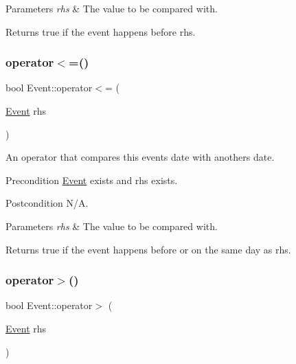 \begin{DoxyParams}{Parameters}
{\em rhs} & The value to be compared with. \\
\hline
\end{DoxyParams}
\begin{DoxyReturn}{Returns}
true if the event happens before rhs. 
\end{DoxyReturn}
\mbox{\label{class_event_a4904fea0b4f4f5bd57ba4858414f32ed}} 
\subsubsection{\texorpdfstring{operator$<$=()}{operator<=()}}
{\footnotesize\ttfamily bool Event\+::operator$<$= (\begin{DoxyParamCaption}\item[{\mbox{\hyperlink{class_event}{Event}}}]{rhs }\end{DoxyParamCaption})}

An operator that compares this event\textquotesingle{}s date with another\textquotesingle{}s date. \begin{DoxyPrecond}{Precondition}
\mbox{\hyperlink{class_event}{Event}} exists and rhs exists. 
\end{DoxyPrecond}
\begin{DoxyPostcond}{Postcondition}
N/A. 
\end{DoxyPostcond}

\begin{DoxyParams}{Parameters}
{\em rhs} & The value to be compared with. \\
\hline
\end{DoxyParams}
\begin{DoxyReturn}{Returns}
true if the event happens before or on the same day as rhs. 
\end{DoxyReturn}
\mbox{\label{class_event_aceb2fbaf2cb83f5d7e14787db516cd34}} 
\subsubsection{\texorpdfstring{operator$>$()}{operator>()}}
{\footnotesize\ttfamily bool Event\+::operator$>$ (\begin{DoxyParamCaption}\item[{\mbox{\hyperlink{class_event}{Event}}}]{rhs }\end{DoxyParamCaption})}

